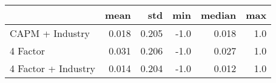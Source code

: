 \begin{tabular}{lrrrrr}
\toprule
{} &   mean &    std &  min &  median &  max \\
\midrule
 CAPM + Industry    &  0.018 &  0.205 & -1.0 &   0.018 &  1.0 \\
4 Factor            &  0.031 &  0.206 & -1.0 &   0.027 &  1.0 \\
4 Factor + Industry &  0.014 &  0.204 & -1.0 &   0.012 &  1.0 \\
\bottomrule
\end{tabular}
